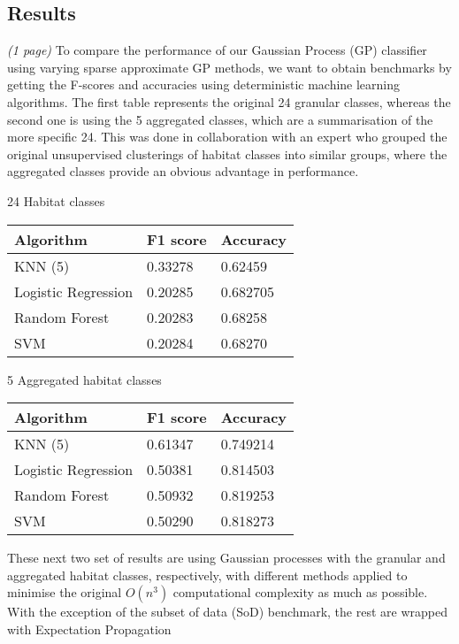 \documentclass[10pt]{article}
\begin{document}
\begin{multicols}{2}
\vfill
\columnbreak

\section{Results}
\textit{(1 page)}
To compare the performance of our Gaussian Process (GP) classifier using varying sparse approximate GP methods, we want to obtain benchmarks by getting the F-scores and accuracies using deterministic machine learning algorithms. The first table represents the original 24 granular classes, whereas the second one is using the 5 aggregated classes, which are a summarisation of the more specific 24. This was done in collaboration with an expert who grouped the original unsupervised clusterings of habitat classes into similar groups, where the aggregated classes provide an obvious advantage in performance.
    
24 Habitat classes

\begin{tabular}{| l | l | l |}
    \hline
    Algorithm           & F1 score & Accuracy \\\hline
    KNN (5)             & 0.33278 & 0.62459 \\
    Logistic Regression & 0.20285 & 0.682705 \\
    Random Forest       & 0.20283 & 0.68258 \\
    SVM                 & 0.20284 & 0.68270 \\\hline
\end{tabular}

5 Aggregated habitat classes

\begin{tabular}{| l | l | l |}
    \hline
    Algorithm           & F1 score & Accuracy \\\hline
    KNN (5)             & 0.61347 & 0.749214 \\
    Logistic Regression & 0.50381 & 0.814503 \\
    Random Forest       & 0.50932 & 0.819253 \\
    SVM                 & 0.50290 & 0.818273 \\\hline
\end{tabular}

These next two set of results are using Gaussian processes with the granular and aggregated habitat classes, respectively, with different methods applied to minimise the original $O(n^3)$ computational complexity as much as possible. With the exception of the subset of data (SoD) benchmark, the rest are wrapped with Expectation Propagation


\end{multicols}
\end{document}
